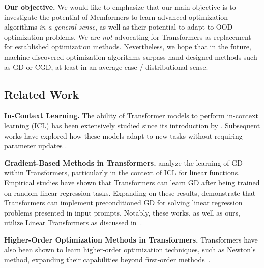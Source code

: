 \documentclass[11pt]{article}
\theoremstyle{plain}
\theoremstyle{definition}
\theoremstyle{remark}
\numberwithin{equation}{section}
\begin{document}
\textbf{Our objective.}
We would like to emphasize that our main objective is to investigate the potential of Memformers to learn advanced optimization algorithms \emph{in a general sense}, as well as their potential to adapt to OOD optimization problems. We are \emph{not} advocating for Transformers as replacement for established optimization methods. %
Nevertheless, we hope that in the future, machine-discovered optimization algorithms surpass hand-designed methods such as GD or CGD, at least in an average-case / distributional sense. %

\subsection{Related Work}
\textbf{In-Context Learning.} 
The ability of Transformer models to perform in-context learning (ICL) has been extensively studied since its introduction by \citet{brown2020language}. Subsequent works have explored how these models adapt to new tasks without requiring parameter updates \citep{xie2021explanation, von2023uncovering, hahn2023theory, liu2021makes, lu2021fantastically, wei2022chain, wu2022self}.

\noindent\textbf{Gradient-Based Methods in Transformers.} 
\citet{garg2022can} analyze the learning of GD within Transformers, particularly in the context of ICL for linear functions. Empirical studies \citep{garg2022can, akyurek2022learning, von2023transformers} have shown that Transformers can learn GD after being trained on random linear regression tasks. Expanding on these results, \citet{von2023transformers, ahn2024transformers} demonstrate that Transformers can implement preconditioned GD for solving linear regression problems presented in input prompts. Notably, these works, as well as ours, utilize Linear Transformers as discussed in~\citep{schlag2021linear, von2023transformers, ahn2023linear}.

\noindent\textbf{Higher-Order Optimization Methods in Transformers.} 
Transformers have also been shown to learn higher-order optimization techniques, such as Newton's method, expanding their capabilities beyond first-order methods~\citep{fu2023transformers, giannou2024well, vladymyrov2024linear}.
\end{document}
